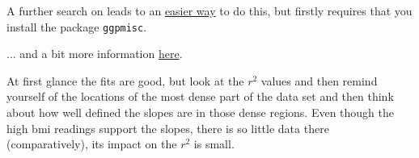 \documentclass[titlepage]{book}\usepackage{knitr}
\begin{document}
A further search on  leads to an \href{http://stackoverflow.com/questions/7549694/ggplot2-adding-regression-line-equation-and-r2-on-graph}{easier way} to do this, but firstly requires that you install the package \texttt{ggpmisc}.


\begin{knitrout}
\color{fgcolor}\begin{kframe}
\begin{alltt}
\hlstd{(}\hlstd{,}  \hlstd{=} \hlstd{,}  \hlstd{=} \hlstd{,}  \hlstd{=} \hlstd{)}
 \hlkwb{<-}  \hlopt{~} 
 \hlkwb{<-} \hlstd{(}  \hlstd{(}     
                              \hlstd{=} \hlstd{))} \hlopt{+}
  \hlstd{(} \hlstd{=} \hlstd{,} \hlstd{=}\hlstd{)} \hlopt{+} \hlstd{(}\hlstd{,}\hlstd{)} \hlopt{+}
  \hlstd{(} 
               \hlstd{(} \hlstd{=} 
                                  \hlstd{=} \hlstd{,}\hlstd{=}\hlstd{,} \hlstd{=}\hlstd{),} \hlstd{=}\hlstd{),}
                \hlstd{=} \hlstd{)} \hlopt{+}
  \hlstd{()}\hlopt{+} \hlopt{~}
\hlstd{()}
\end{alltt}
\end{kframe}
\end{knitrout}

... and a bit more information \href{https://stackoverflow.com/questions/19699858/ggplot-adding-regression-line-equation-and-r2-with-facet}{here}.


At first glance the fits are good, but look at the $r^2$ values and then remind yourself of the locations of the most dense part of the data set and then think about how well defined the slopes are in those dense regions.  Even though the high bmi readings support the slopes, there is so little data there (comparatively), its impact on the $r^2$ is small.
\end{document}
